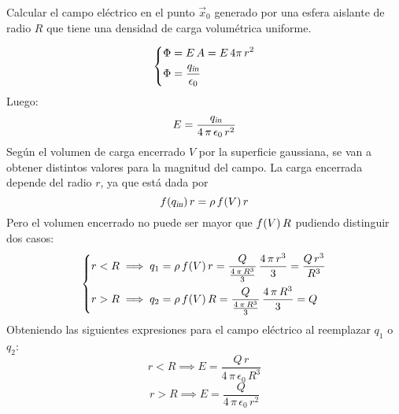 \begin{mdframed}[style=ExampleFrame]
    \begin{example}
    \end{example}
    \begin{formatI}
        Calcular el campo eléctrico en el punto $\vec{x}_0$ generado por una esfera aislante de radio $R$ que tiene una densidad de carga volumétrica uniforme.
    \end{formatI}
    \begin{center}
        \def\svgwidth{0.7\linewidth}
        
    \end{center}
    \begin{equation*}
        \left\{
        \begin{aligned}
            \Phi &= E \, A = E \, 4 \pi \, r^2
            \\
            \Phi &= \frac{{{q}_\textsl{{in}}}}{\epsilon_0}
        \end{aligned}
        \right.
    \end{equation*}
    Luego:
    \begin{equation*}
        E = \frac{{{q}_\textsl{{in}}}}{4 \, \pi \, \epsilon_0 \, r^2}
    \end{equation*}
    Según el volumen de carga encerrado $V$ por la superficie gaussiana, se van a obtener distintos valores para la magnitud del campo.
    La carga encerrada depende del radio $r$, ya que está dada por
    \begin{equation*}
        f \hspace{-0.5mm} \left( {{q}_\textsl{{in}}} \right){r} = \rho \, f \hspace{-0.5mm} \left( V \right){r}
    \end{equation*}
    Pero el volumen encerrado no puede ser mayor que $f \hspace{-0.5mm} \left( V \right){R}$ pudiendo distinguir dos casos:
    \begin{equation*}
        \left\{
        \begin{aligned}
            r<R & \implies q_1 = \rho \, f \hspace{-0.5mm} \left( V \right){r} = \frac{Q}{\frac{4 \, \pi \, R^3}{3}} \, \frac{4 \, \pi \, r^3}{3} = \frac{Q \, r^3}{R^3}
            \\
            r>R & \implies q_2 = \rho \, f \hspace{-0.5mm} \left( V \right){R} = \frac{Q}{\frac{4 \, \pi \, R^3}{3}} \, \frac{4 \, \pi \, R^3}{3} = Q
        \end{aligned}
        \right.
    \end{equation*}
    Obteniendo las siguientes expresiones para el campo eléctrico al reemplazar $q_1$ o $q_2$:
        \begin{equation}
            r<R \implies E = \frac{Q \, r}{4 \, \pi \, \epsilon_0 \, R^3}
            \label{eqn:esferaInt}
        \end{equation}
        \begin{equation}
            r>R \implies E = \frac{Q}{4 \, \pi \, \epsilon_0 \, r^2}
            \label{eqn:esferaExt}
        \end{equation}
    \begin{center}
        \def\svgwidth{0.7\linewidth}
        
    \end{center}
\end{mdframed}


